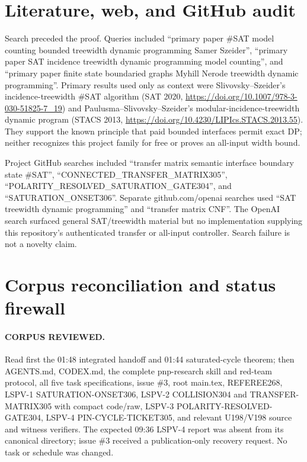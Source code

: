 \documentclass[11pt]{article}
\begin{document}
\section{Literature, web, and GitHub audit}
Search preceded the proof.  Queries included ``primary paper \#SAT model counting bounded treewidth dynamic programming Samer Szeider'', ``primary paper SAT incidence treewidth dynamic programming model counting'', and ``primary paper finite state boundaried graphs Myhill Nerode treewidth dynamic programming''.  Primary results used only as context were Slivovsky--Szeider's incidence-treewidth \#SAT algorithm (SAT 2020, \url{https://doi.org/10.1007/978-3-030-51825-7_19}) and Paulusma--Slivovsky--Szeider's modular-incidence-treewidth dynamic program (STACS 2013, \url{https://doi.org/10.4230/LIPIcs.STACS.2013.55}).  They support the known principle that paid bounded interfaces permit exact DP; neither recognizes this project family for free or proves an all-input width bound.

Project GitHub searches included ``transfer matrix semantic interface boundary state \#SAT'', ``CONNECTED\_TRANSFER\_MATRIX305'', ``POLARITY\_RESOLVED\_SATURATION\_GATE304'', and ``SATURATION\_ONSET306''.  Separate github.com/openai searches used ``SAT treewidth dynamic programming'' and ``transfer matrix CNF''.  The OpenAI search surfaced general SAT/treewidth material but no implementation supplying this repository's authenticated transfer or all-input controller.  Search failure is not a novelty claim.

\section{Corpus reconciliation and status firewall}
\paragraph{CORPUS REVIEWED.}
Read first the 01:48 integrated handoff and 01:44 saturated-cycle theorem; then AGENTS.md, CODEX.md, the complete pnp-research skill and red-team protocol, all five task specifications, issue \#3, root main.tex, REFEREE268, LSPV-1 SATURATION-ONSET306, LSPV-2 COLLISION304 and TRANSFER-MATRIX305 with compact code/raw, LSPV-3 POLARITY-RESOLVED-GATE304, LSPV-4 PIN-CYCLE-TICKET305, and relevant U198/V198 source and witness verifiers.  The expected 09:36 LSPV-4 report was absent from its canonical directory; issue \#3 received a publication-only recovery request.  No task or schedule was changed.
\end{document}
